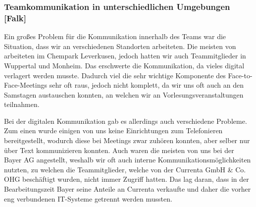\subsubsection{Teamkommunikation in unterschiedlichen Umgebungen [Falk]}

Ein großes Problem für die Kommunikation innerhalb des Teams war die Situation, dass wir an verschiedenen Standorten arbeiteten. Die meisten von arbeiteten im Chempark Leverkusen, jedoch hatten wir auch Teammitglieder in Wuppertal und Monheim. Das erschwerte die Kommunikation, da vieles digital verlagert werden musste. Dadurch viel die sehr wichtige Komponente des Face-to-Face-Meetings sehr oft raus, jedoch nicht komplett, da wir uns oft auch an den Samstagen austauschen konnten, an welchen wir an Vorlesungsveranstaltungen teilnahmen. 

Bei der digitalen Kommunikation gab es allerdings auch verschiedene Probleme. Zum einen wurde einigen von uns keine Einrichtungen zum Telefonieren bereitgestellt, wodurch diese bei Meetings zwar zuhören konnten, aber selber nur über Text kommunizieren konnten. Auch waren die meisten von uns bei der Bayer AG angestellt, weshalb wir oft auch interne Kommunikationsmöglichkeiten nutzten, zu welchen die Teammitglieder, welche von der Currenta GmbH \& Co. OHG beschäftigt wurden, nicht immer Zugriff hatten. Das lag daran, dass in der Bearbeitungszeit Bayer seine Anteile an Currenta verkaufte und daher die vorher eng verbundenen IT-Systeme getrennt werden mussten.

